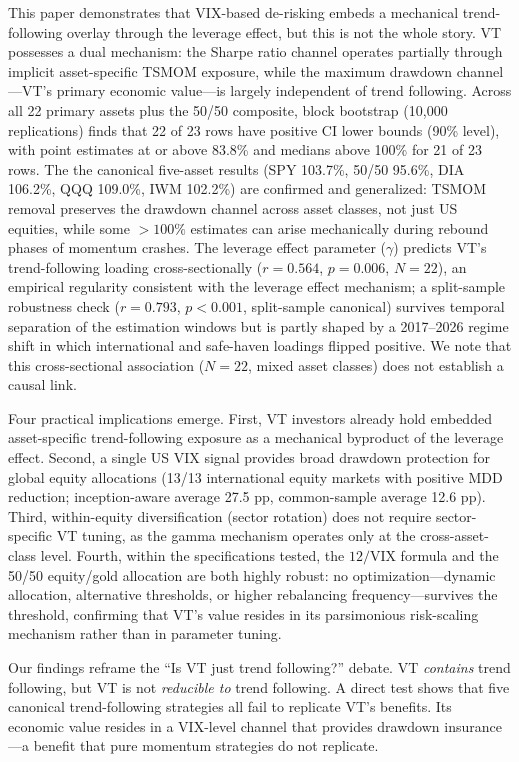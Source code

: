 This paper demonstrates that VIX-based de-risking embeds a mechanical trend-following overlay through the leverage effect, but this is not the whole story. VT possesses a dual mechanism: the Sharpe ratio channel operates partially through implicit asset-specific TSMOM exposure, while the maximum drawdown channel---VT's primary economic value---is largely independent of trend following. Across all 22 primary assets plus the 50/50 composite, block bootstrap (10,000 replications) finds that 22 of 23 rows have positive CI lower bounds (90\% level), with point estimates at or above 83.8\% and medians above 100\% for 21 of 23 rows. The the canonical five-asset results (SPY 103.7\%, 50/50 95.6\%, DIA 106.2\%, QQQ 109.0\%, IWM 102.2\%) are confirmed and generalized: TSMOM removal preserves the drawdown channel across asset classes, not just US equities, while some $>100\%$ estimates can arise mechanically during rebound phases of momentum crashes. The leverage effect parameter ($\gamma$) predicts VT's trend-following loading cross-sectionally ($r = 0.564$, $p = 0.006$, $N = 22$), an empirical regularity consistent with the leverage effect mechanism; a split-sample robustness check ($r = 0.793$, $p < 0.001$, split-sample canonical) survives temporal separation of the estimation windows but is partly shaped by a 2017--2026 regime shift in which international and safe-haven loadings flipped positive. We note that this cross-sectional association ($N = 22$, mixed asset classes) does not establish a causal link.

Four practical implications emerge. First, VT investors already hold embedded asset-specific trend-following exposure as a mechanical byproduct of the leverage effect. Second, a single US VIX signal provides broad drawdown protection for global equity allocations (13/13 international equity markets with positive MDD reduction; inception-aware average 27.5 pp, common-sample average 12.6 pp). Third, within-equity diversification (sector rotation) does not require sector-specific VT tuning, as the gamma mechanism operates only at the cross-asset-class level. Fourth, within the specifications tested, the $12/\text{VIX}$ formula and the 50/50 equity/gold allocation are both highly robust: no optimization---dynamic allocation, alternative thresholds, or higher rebalancing frequency---survives the \citet{harvey2016} threshold, confirming that VT's value resides in its parsimonious risk-scaling mechanism rather than in parameter tuning.

Our findings reframe the ``Is VT just trend following?'' debate. VT \textit{contains} trend following, but VT is not \textit{reducible to} trend following. A direct test shows that five canonical trend-following strategies all fail to replicate VT's benefits. Its economic value resides in a VIX-level channel that provides drawdown insurance---a benefit that pure momentum strategies do not replicate.


